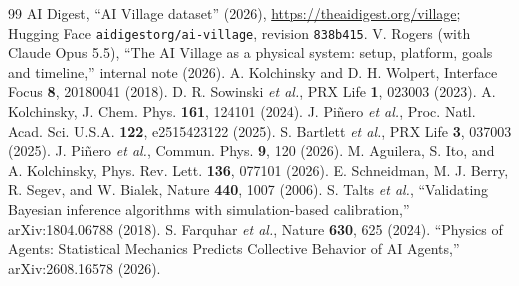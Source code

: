 \documentclass[reprint,aps,pre,10pt,superscriptaddress,nofootinbib]{revtex4-2}
\begin{document}
\begin{thebibliography}{99}
 AI Digest, ``AI Village dataset'' (2026), \url{https://theaidigest.org/village}; Hugging Face \texttt{aidigestorg/ai-village}, revision \texttt{838b415}.
 V. Rogers (with Claude Opus 5.5), ``The AI Village as a physical system: setup, platform, goals and timeline,'' internal note (2026).
 A. Kolchinsky and D. H. Wolpert, Interface Focus \textbf{8}, 20180041 (2018).
 D. R. Sowinski \textit{et al.}, PRX Life \textbf{1}, 023003 (2023).
 A. Kolchinsky, J. Chem. Phys. \textbf{161}, 124101 (2024).
 J. Piñero \textit{et al.}, Proc. Natl. Acad. Sci. U.S.A. \textbf{122}, e2515423122 (2025).
 S. Bartlett \textit{et al.}, PRX Life \textbf{3}, 037003 (2025).
 J. Piñero \textit{et al.}, Commun. Phys. \textbf{9}, 120 (2026).
 M. Aguilera, S. Ito, and A. Kolchinsky, Phys. Rev. Lett. \textbf{136}, 077101 (2026).
 E. Schneidman, M. J. Berry, R. Segev, and W. Bialek, Nature \textbf{440}, 1007 (2006).
 S. Talts \textit{et al.}, ``Validating Bayesian inference algorithms with simulation-based calibration,'' arXiv:1804.06788 (2018).
 S. Farquhar \textit{et al.}, Nature \textbf{630}, 625 (2024).
 ``Physics of Agents: Statistical Mechanics Predicts Collective Behavior of AI Agents,'' arXiv:2608.16578 (2026). %
\end{thebibliography}
\end{document}
